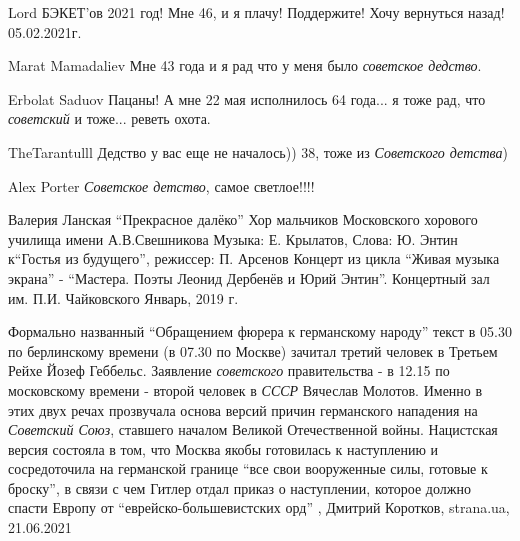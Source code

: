 Lord БЭКЕТ'ов
2021 год! Мне 46, и я плачу! Поддержите! Хочу вернуться назад! 05.02.2021г.

Marat Mamadaliev
Мне 43 года и я рад что у меня было \emph{советское дедство}. 

Erbolat Saduov
Пацаны! А мне 22 мая исполнилось 64 года... я тоже рад, что \emph{советский} и тоже... 
реветь охота. 

TheTarantulll
Дедство у вас еще не началось)) 38, тоже из \emph{Советского детства}) 

Alex Porter
\emph{Советское детство}, самое светлое!!!! 

Валерия Ланская \enquote{Прекрасное далёко}
Хор мальчиков Московского хорового училища имени А.В.Свешникова
Музыка: Е. Крылатов, Слова: Ю. Энтин
к\ф \enquote{Гостья из будущего},  режиссер: П. Арсенов
Концерт из цикла \enquote{Живая музыка экрана} - \enquote{Мастера. Поэты Леонид Дербенёв и Юрий
Энтин}.  Концертный зал им. П.И. Чайковского
Январь, 2019 г.

Формально названный \enquote{Обращением фюрера к германскому народу} текст в
05.30 по берлинскому времени (в 07.30 по Москве) зачитал третий человек в
Третьем Рейхе Йозеф Геббельс. Заявление \emph{советского} правительства - в
12.15 по московскому времени - второй человек в \emph{СССР} Вячеслав Молотов.
Именно в этих двух речах прозвучала основа версий причин германского нападения
на \emph{Советский Союз}, ставшего началом Великой Отечественной войны.
Нацистская версия состояла в том, что Москва якобы готовилась к наступлению и
сосредоточила на германской границе \enquote{все свои вооруженные силы, готовые
к броску}, в связи с чем Гитлер отдал приказ о наступлении, которое должно
спасти Европу от \enquote{еврейско-большевистских орд}
, 
Дмитрий Коротков, strana.ua, 21.06.2021

